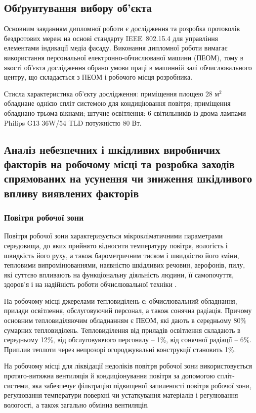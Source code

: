 \documentclass[a4paper,ukrainian,utf8,nocolumnsxix,floatsection,equationsection]{eskdtext}
\renewcommand\paragraph{\subsubsection}
\newcommand{\iee}[0]{IEEE~802.15.4\xspace}
\begin{document}
\subsection{Обґрунтування вибору об’єкта}

Основним завданням дипломної роботи є дослідження та розробка протоколів бездротових мереж на основі стандарту \iee для управління елементами індикації медіа фасаду. Виконання дипломної роботи вимагає використання персональної електронно-обчислюваної машини (ПЕОМ), тому в якості об’єкта дослідження обрано умови праці в машинній залі обчислювального центру, що складається з ПЕОМ і робочого місця розробника.

Стисла характеристика об’єкту дослідження: приміщення площею $28 \text{ м}^2$ обладнане однією спліт системою для кондиціювання повітря; приміщення обладнано трьома вікнами; штучне освітлення: 6 світильників із двома лампами Philips G13 36W/54 TLD потужністю 80 Вт.


\subsection{Аналіз небезпечних і шкідливих виробничих факторів на робочому місці та розробка заходів спрямованих на усунення чи зниження шкідливого впливу виявлених факторів}

\paragraph{Повітря робочої зони}

Повітря робочої зони характеризується мікрокліматичними параметрами середовища, до яких прийнято відносити температуру повітря, вологість і швидкість його руху, а також барометричним тиском і швидкістю його зміни, тепловими випромінюваннями, наявністю шкідливих речовин, аерофонів, пилу, які суттєво впливають на функціональну діяльність людини, її самопочуття, здоров'я і на надійність роботи обчислювальної техніки \cite{work:safety:17}. 

На робочому місці джерелами тепловиділень є: обчислювальний обладнання, прилади освітлення, обслуговуючий персонал, а також сонячна радіація. Причому основним тепловиділяючим обладнанням є ПЕОМ, які дають в середньому 80\% сумарних тепловиділень. Тепловиділення від приладів освітлення складають в середньому 12\%, від обслуговуючого персоналу – 1\%, від сонячної радіації – 6\%. Приплив теплоти через непрозорі огороджувальні конструкції становить 1\%.

На робочому місці для ліквідації недоліків повітря робочої зони використовується протяго-витяжна вентиляція й кондиціонування повітря за допомогою спліт-системи, яка забезпечує фільтрацію підвищеної запиленості повітря робочої зони, регулювання температури поверхні чи устаткування матеріалів і регулювання вологості, а також загально обмінна вентиляція.
\end{document}
